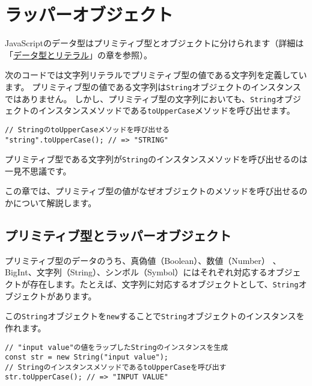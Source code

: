 \hypertarget{wrapper-object}{%
\chapter{ラッパーオブジェクト}\label{wrapper-object}}
\thispagestyle{frontheadings}

JavaScriptのデータ型はプリミティブ型とオブジェクトに分けられます（詳細は「\hyperlink{data-type-and-literal}{データ型とリテラル}」の章を参照）。

次のコードでは文字列リテラルでプリミティブ型の値である文字列を定義しています。
プリミティブ型の値である文字列は\texttt{String}オブジェクトのインスタンスではありません。
しかし、プリミティブ型の文字列においても、\texttt{String}オブジェクトのインスタンスメソッドである\texttt{toUpperCase}メソッドを呼び出せます。

\begin{lstlisting}
// StringのtoUpperCaseメソッドを呼び出せる
"string".toUpperCase(); // => "STRING"
\end{lstlisting}

プリミティブ型である文字列が\texttt{String}のインスタンスメソッドを呼び出せるのは一見不思議です。

この章では、プリミティブ型の値がなぜオブジェクトのメソッドを呼び出せるのかについて解説します。

\hypertarget{primitive-type-and-wrapper-object}{%
\section{プリミティブ型とラッパーオブジェクト}\label{primitive-type-and-wrapper-object}}

プリミティブ型のデータのうち、真偽値（Boolean）、数値（Number）
、BigInt、文字列（String）、シンボル（Symbol）にはそれぞれ対応するオブジェクトが存在します。たとえば、文字列に対応するオブジェクトとして、\texttt{String}オブジェクトがあります。

この\texttt{String}オブジェクトを\texttt{new}することで\texttt{String}オブジェクトのインスタンスを作れます。

\begin{lstlisting}
// "input value"の値をラップしたStringのインスタンスを生成
const str = new String("input value");
// StringのインスタンスメソッドであるtoUpperCaseを呼び出す
str.toUpperCase(); // => "INPUT VALUE"
\end{lstlisting}

